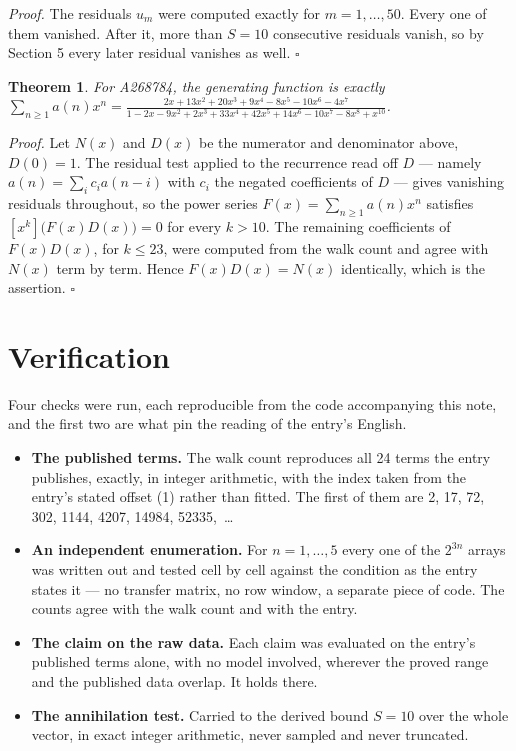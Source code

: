 \documentclass[11pt]{article}
\newtheorem{theorem}{Theorem}
\theoremstyle{definition}
\begin{document}
{\itshape Proof.} The residuals $u_m$ were computed exactly for $m = 1,\dots,50$. Every one of them vanished. After it, more than $S = 10$ consecutive residuals vanish, so by Section 5 every later residual vanishes as well. $\square$

\begin{theorem} For A268784, the generating function is exactly $\sum_{n\ge 1} a(n)x^n = \frac{2x + 13x^{2} + 20x^{3} + 9x^{4} - 8x^{5} - 10x^{6} - 4x^{7}}{1 - 2x - 9x^{2} + 2x^{3} + 33x^{4} + 42x^{5} + 14x^{6} - 10x^{7} - 8x^{8} + x^{10}}$.\end{theorem}

{\itshape Proof.} Let $N(x)$ and $D(x)$ be the numerator and denominator above, $D(0)=1$. The residual test applied to the recurrence read off $D$ --- namely $a(n) = \sum_i c_i a(n-i)$ with $c_i$ the negated coefficients of $D$ --- gives vanishing residuals throughout, so the power series $F(x)=\sum_{n\ge 1}a(n)x^n$ satisfies $[x^k]\bigl(F(x)D(x)\bigr) = 0$ for every $k > 10$. The remaining coefficients of $F(x)D(x)$, for $k \le 23$, were computed from the walk count and agree with $N(x)$ term by term. Hence $F(x)D(x) = N(x)$ identically, which is the assertion. $\square$

\section{Verification}

Four checks were run, each reproducible from the code accompanying this note, and the first two are what pin the reading of the entry's English.

\begin{itemize}

\item {\bfseries The published terms.} The walk count reproduces all 24 terms the entry publishes, exactly, in integer arithmetic, with the index taken from the entry's stated offset (1) rather than fitted. The first of them are 2, 17, 72, 302, 1144, 4207, 14984, 52335,~\dots

\item {\bfseries An independent enumeration.} For $n = 1,\dots,5$ every one of the $2^{3n}$ arrays was written out and tested cell by cell against the condition as the entry states it --- no transfer matrix, no row window, a separate piece of code. The counts agree with the walk count and with the entry.

\item {\bfseries The claim on the raw data.} Each claim was evaluated on the entry's published terms alone, with no model involved, wherever the proved range and the published data overlap. It holds there.

\item {\bfseries The annihilation test.} Carried to the derived bound $S = 10$ over the whole vector, in exact integer arithmetic, never sampled and never truncated.

\end{itemize}
\end{document}
